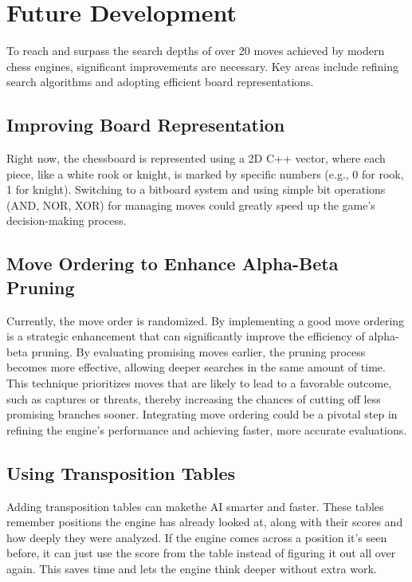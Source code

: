 \documentclass{article}
\begin{document}
\section{Future Development}

To reach and surpass the search depths of over 20 moves achieved by modern chess engines, significant improvements are necessary. Key areas include refining search algorithms and adopting efficient board representations.

\subsection{Improving Board Representation}

Right now, the chessboard is represented using a 2D C++ vector, where each piece, like a white rook or knight, is marked by specific numbers (e.g., 0 for rook, 1 for knight). Switching to a bitboard system and using simple bit operations (AND, NOR, XOR) for managing moves could greatly speed up the game's decision-making process.

\subsection{Move Ordering to Enhance Alpha-Beta Pruning}

Currently, the move order is randomized. By implementing a good move ordering is a strategic enhancement that can significantly improve the efficiency of alpha-beta pruning. By evaluating promising moves earlier, the pruning process becomes more effective, allowing deeper searches in the same amount of time. This technique prioritizes moves that are likely to lead to a favorable outcome, such as captures or threats, thereby increasing the chances of cutting off less promising branches sooner. Integrating move ordering could be a pivotal step in refining the engine's performance and achieving faster, more accurate evaluations.

\subsection{Using Transposition Tables}
Adding transposition tables can makethe AI smarter and faster. These tables remember positions the engine has already looked at, along with their scores and how deeply they were analyzed. If the engine comes across a position it's seen before, it can just use the score from the table instead of figuring it out all over again. This saves time and lets the engine think deeper without extra work.
\end{document}
